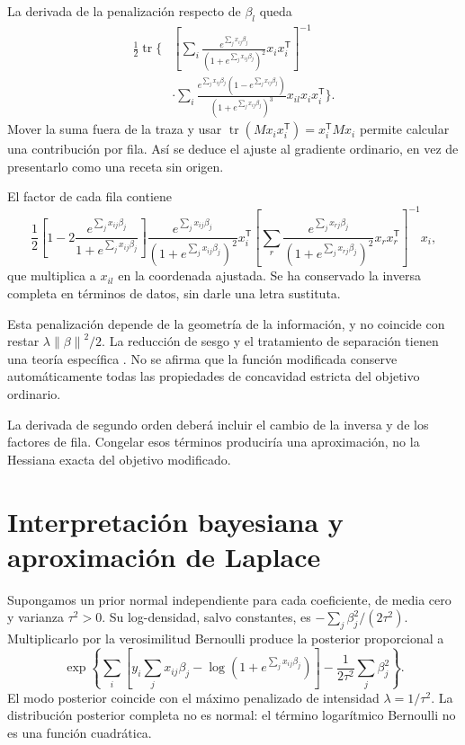 \documentclass[11pt,a4paper]{article}
\newcommand{\T}{^{\mathsf T}}
\newcommand{\norm}[1]{\left\lVert #1\right\rVert}
\DeclareMathOperator{\tr}{tr}
\begin{document}
La derivada de la penalización respecto de $\beta_l$
queda
\[
\begin{aligned}
\frac12\tr\bigg\{&
\left[\sum_i
\frac{e^{\sum_jx_{ij}\beta_j}}
{(1+e^{\sum_jx_{ij}\beta_j})^2}x_ix_i\T\right]^{-1}\\
&\cdot\sum_i
\frac{e^{\sum_jx_{ij}\beta_j}(1-e^{\sum_jx_{ij}\beta_j})}
{(1+e^{\sum_jx_{ij}\beta_j})^3}
x_{il}x_ix_i\T\bigg\}.
\end{aligned}
\]
Mover la suma fuera de la traza y usar
$\tr(Mx_ix_i\T)=x_i\T Mx_i$
permite calcular una contribución por fila.
Así se deduce el ajuste al gradiente ordinario,
en vez de presentarlo como una receta sin origen.

El factor de cada fila contiene
\[
\frac12\left[
1-2\frac{e^{\sum_jx_{ij}\beta_j}}
{1+e^{\sum_jx_{ij}\beta_j}}\right]
\frac{e^{\sum_jx_{ij}\beta_j}}
{(1+e^{\sum_jx_{ij}\beta_j})^2}
x_i\T
\left[\sum_r
\frac{e^{\sum_jx_{rj}\beta_j}}
{(1+e^{\sum_jx_{rj}\beta_j})^2}x_rx_r\T\right]^{-1}x_i,
\]
que multiplica a $x_{il}$ en la coordenada ajustada.
Se ha conservado la inversa completa en términos de datos,
sin darle una letra sustituta.

Esta penalización depende de la geometría de la información,
y no coincide con restar $\lambda\norm\beta^2/2$.
La reducción de sesgo y el tratamiento de separación tienen
una teoría específica \cite{heinze}.
No se afirma que la función modificada conserve automáticamente
todas las propiedades de concavidad estricta del objetivo ordinario.

La derivada de segundo orden deberá incluir el cambio
de la inversa y de los factores de fila.
Congelar esos términos produciría una aproximación,
no la Hessiana exacta del objetivo modificado.

\clearpage
\section{Interpretación bayesiana y aproximación de Laplace}\label{logit69}
Supongamos un prior normal independiente para cada
coeficiente, de media cero y varianza $\tau^2>0$.
Su log-densidad, salvo constantes, es
$-\sum_j\beta_j^2/(2\tau^2)$.
Multiplicarlo por la verosimilitud Bernoulli produce
la posterior proporcional a
\[
\exp\left\{
\sum_i\left[y_i\sum_jx_{ij}\beta_j-
\log(1+e^{\sum_jx_{ij}\beta_j})\right]
-\frac1{2\tau^2}\sum_j\beta_j^2
\right\}.
\]
El modo posterior coincide con el máximo penalizado
de intensidad $\lambda=1/\tau^2$.
La distribución posterior completa no es normal:
el término logarítmico Bernoulli no es una función cuadrática.
\end{document}
